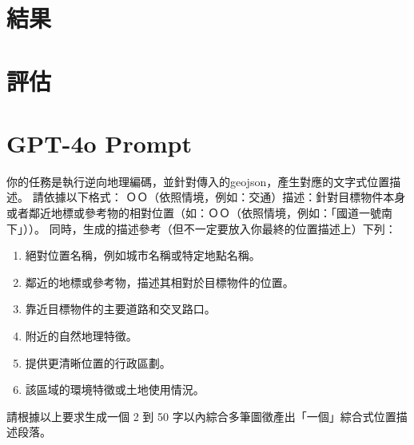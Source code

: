 
\section{結果}



\clearpage
\section{評估}



\clearpage
\section{GPT-4o Prompt}
 
你的任務是執行逆向地理編碼，並針對傳入的geojson，產生對應的文字式位置描述。
請依據以下格式：
ＯＯ（依照情境，例如：交通）描述：針對目標物件本身或者鄰近地標或參考物的相對位置（如：ＯＯ（依照情境，例如：「國道一號南下」））。
同時，生成的描述參考（但不一定要放入你最終的位置描述上）下列：
  \begin{enumerate}
    \item 絕對位置名稱，例如城市名稱或特定地點名稱。
    \item 鄰近的地標或參考物，描述其相對於目標物件的位置。
    \item 靠近目標物件的主要道路和交叉路口。
    \item 附近的自然地理特徵。
    \item 提供更清晰位置的行政區劃。
    \item 該區域的環境特徵或土地使用情況。
  \end{enumerate}
請根據以上要求生成一個 2 到 50 字以內綜合多筆圖徵產出「一個」綜合式位置描述段落。